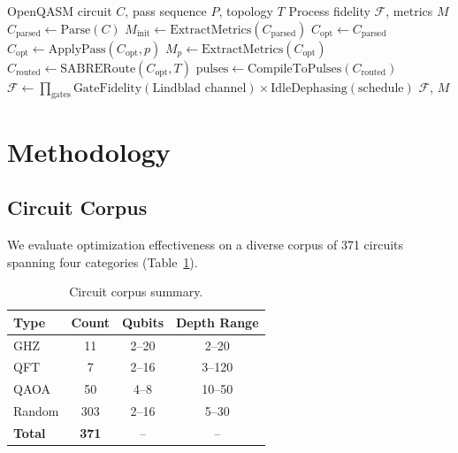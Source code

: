 \documentclass[sigconf,nonacm]{acmart}
\newcommand{\fid}{\mathcal{F}}
\begin{document}
\begin{algorithm}[t]
\caption{End-to-End Fidelity Analysis Pipeline}
\label{alg:pipeline}
\begin{algorithmic}[1]
\Require OpenQASM circuit $C$, pass sequence $P$, topology $T$
\Ensure Process fidelity $\fid$, metrics $M$
\State $C_{\text{parsed}} \gets \text{Parse}(C)$
\State $M_{\text{init}} \gets \text{ExtractMetrics}(C_{\text{parsed}})$
\State $C_{\text{opt}} \gets C_{\text{parsed}}$
    \State $C_{\text{opt}} \gets \text{ApplyPass}(C_{\text{opt}}, p)$
    \State $M_p \gets \text{ExtractMetrics}(C_{\text{opt}})$
\EndFor
\State $C_{\text{routed}} \gets \text{SABRERoute}(C_{\text{opt}}, T)$
\State $\text{pulses} \gets \text{CompileToPulses}(C_{\text{routed}})$
\State $\fid \gets \prod_{\text{gates}} \text{GateFidelity}(\text{Lindblad channel}) \times \text{IdleDephasing}(\text{schedule})$
\State \Return $\fid$, $M$
\end{algorithmic}
\end{algorithm}

\section{Methodology}
\label{sec:methodology}

\subsection{Circuit Corpus}

We evaluate optimization effectiveness on a diverse corpus of 371 circuits spanning four categories (Table~\ref{tab:corpus}).

\begin{table}[t]
\centering
\caption{Circuit corpus summary.}
\label{tab:corpus}
\begin{tabular}{lccc}
\toprule
Type & Count & Qubits & Depth Range \\
\midrule
GHZ & 11 & 2--20 & 2--20 \\
QFT & 7 & 2--16 & 3--120 \\
QAOA & 50 & 4--8 & 10--50 \\
Random & 303 & 2--16 & 5--30 \\
\midrule
\textbf{Total} & \textbf{371} & -- & -- \\
\bottomrule
\end{tabular}
\end{table}
\end{document}

